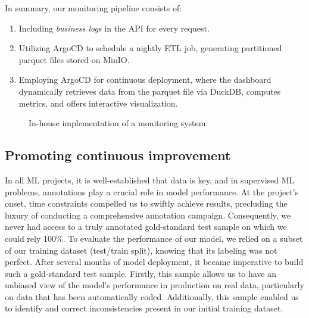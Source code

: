 In summary, our monitoring pipeline consists of:

\begin{enumerate}
    \item Including \textit{business logs} in the API for every request.
    \item Utilizing ArgoCD to schedule a nightly ETL job, generating partitioned parquet files stored on MinIO.
    \item Employing ArgoCD for continuous deployment, where the dashboard dynamically retrieves data from the parquet file via DuckDB, computes metrics, and offers interactive visualization.

\end{enumerate}

\begin{figure}[htbp]
    \centering
    \caption{In-house implementation of a monitoring system}
    \label{fig:monitoring-datalab}
\end{figure}


\subsection{Promoting continuous improvement}

In all ML projects, it is well-established that data is key, and in supervised ML problems, annotations play a crucial role in model performance. At the project's onset, time constraints compelled us to swiftly achieve results, precluding the luxury of conducting a comprehensive annotation campaign. Consequently, we never had access to a truly annotated gold-standard test sample on which we could rely 100\%. To evaluate the performance of our model, we relied on a subset of our training dataset (test/train split), knowing that its labeling was not perfect. After several months of model deployment, it became imperative to build such a gold-standard test sample. Firstly, this sample allows us to have an unbiased view of the model's performance in production on real data, particularly on data that has been automatically coded. Additionally, this sample enabled us to identify and correct inconsistencies present in our initial training dataset. 


